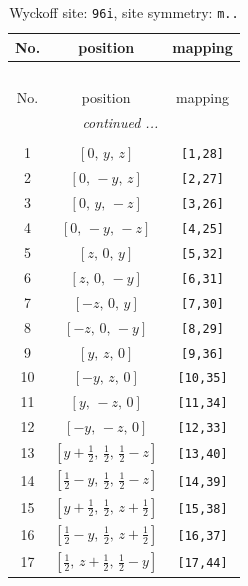 \documentclass[fleqn,8pt]{jsarticle}
\begin{document}
\begin{longtable}{ccc}
\caption{Wyckoff site: {\tt 96i}, site symmetry: {\tt m..}}
 \\
 \hline \hline
No. & position & mapping \\ \hline \endfirsthead

\multicolumn{2}{l}{\tablename\ \thetable{}} \\
 \hline \hline
No. & position & mapping \\ \hline \endhead

 \hline \hline
\multicolumn{2}{r}{\footnotesize\it continued ...} \\ \endfoot

 \hline \hline
\multicolumn{2}{r}{} \\ \endlastfoot

1 & $\left[ 0,\, y,\, z \right]$ & {\tt [1,28]} \\ \hline
2 & $\left[ 0,\, - y,\, z \right]$ & {\tt [2,27]} \\ \hline
3 & $\left[ 0,\, y,\, - z \right]$ & {\tt [3,26]} \\ \hline
4 & $\left[ 0,\, - y,\, - z \right]$ & {\tt [4,25]} \\ \hline
5 & $\left[ z,\, 0,\, y \right]$ & {\tt [5,32]} \\ \hline
6 & $\left[ z,\, 0,\, - y \right]$ & {\tt [6,31]} \\ \hline
7 & $\left[ - z,\, 0,\, y \right]$ & {\tt [7,30]} \\ \hline
8 & $\left[ - z,\, 0,\, - y \right]$ & {\tt [8,29]} \\ \hline
9 & $\left[ y,\, z,\, 0 \right]$ & {\tt [9,36]} \\ \hline
10 & $\left[ - y,\, z,\, 0 \right]$ & {\tt [10,35]} \\ \hline
11 & $\left[ y,\, - z,\, 0 \right]$ & {\tt [11,34]} \\ \hline
12 & $\left[ - y,\, - z,\, 0 \right]$ & {\tt [12,33]} \\ \hline
13 & $\left[ y + \frac{1}{2},\, \frac{1}{2},\, \frac{1}{2} - z \right]$ & {\tt [13,40]} \\ \hline
14 & $\left[ \frac{1}{2} - y,\, \frac{1}{2},\, \frac{1}{2} - z \right]$ & {\tt [14,39]} \\ \hline
15 & $\left[ y + \frac{1}{2},\, \frac{1}{2},\, z + \frac{1}{2} \right]$ & {\tt [15,38]} \\ \hline
16 & $\left[ \frac{1}{2} - y,\, \frac{1}{2},\, z + \frac{1}{2} \right]$ & {\tt [16,37]} \\ \hline
17 & $\left[ \frac{1}{2},\, z + \frac{1}{2},\, \frac{1}{2} - y \right]$ & {\tt [17,44]} \\ \hline

\end{longtable}
\end{document}
